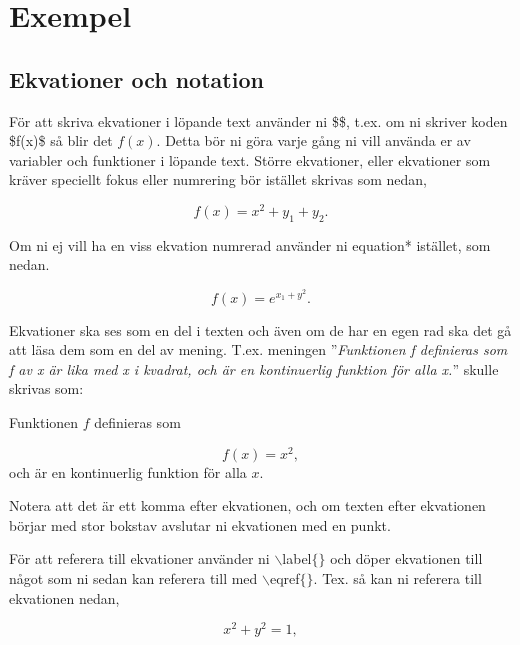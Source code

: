 \section{Exempel}

\subsection{Ekvationer och notation}

För att skriva ekvationer i löpande text använder ni \$\$, t.ex. om ni skriver koden \$f(x)\$ så blir det $f(x)$. Detta bör ni göra varje gång ni vill använda er av variabler och funktioner i löpande text. Större ekvationer, eller ekvationer som kräver speciellt fokus eller numrering bör istället skrivas som nedan,

\begin{equation}
	f(x) = x^2+y_1+y_2.
\end{equation}

\noindent Om ni ej vill ha en viss ekvation numrerad använder ni equation* istället, som nedan.

\begin{equation*}
	f(x) = e^{x_1+y^2}.
\end{equation*}

Ekvationer ska ses som en del i texten och även om de har en egen rad ska det gå att läsa dem som en del av mening. T.ex. meningen ''\textit{Funktionen f definieras som f av x är lika med x i kvadrat, och är en kontinuerlig funktion för alla x.}'' skulle skrivas som:

\bigskip

\noindent Funktionen $f$ definieras som

\begin{equation}
	f(x) = x^2,
\end{equation}
och är en kontinuerlig funktion för alla $x$.

\bigskip

\noindent Notera att det är ett komma efter ekvationen, och om texten efter ekvationen börjar med stor bokstav avslutar ni ekvationen med en punkt.



\noindent För att referera till ekvationer använder ni $\backslash$label$\{\}$ och döper ekvationen till något som ni sedan kan referera till med $\backslash$eqref$\{\}$. Tex. så kan ni referera till ekvationen nedan,

\begin{equation}
	\label{Ekvation1}
    x^2+y^2=1,
\end{equation}

